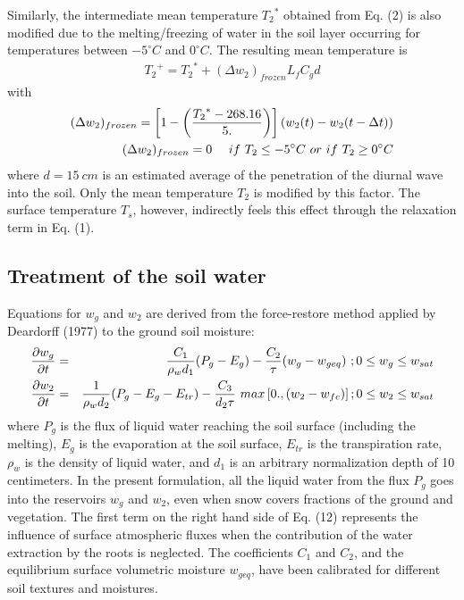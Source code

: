 Similarly, the intermediate mean temperature ${T_2}^*$ obtained
from Eq. (2) is also modified due to the melting/freezing of
water in the soil layer occurring for temperatures
between $-5^\circ C$ and $0^\circ C$.
The resulting mean temperature is
\begin{eqnarray}
{T_2}^+ = {T_2}^* + (\Delta w_2)_{frozen} L_f C_g d
\end{eqnarray}
with
\begin{eqnarray}
(\Delta w_2)_{frozen} = \left[ 1 - \left( { {T_2}^*-268.16
\over 5. } \right) \right] \left( w_2(t) - w_2(t-\Delta t) \right) \\
(\Delta w_2)_{frozen} = 0  \ \ \ \ if \ T_2 \leq -5^\circ C \
or \ if \ T_2 \geq 0^\circ C
\end{eqnarray}
where $d=15 \ cm$ is an estimated average of the penetration of the
diurnal wave into the soil.
Only the mean temperature $T_2$ is modified
by this factor.
The surface temperature $T_s$, however, indirectly
feels this effect through the relaxation term in Eq. (1).

\subsection{Treatment of the soil water}

Equations for $w_g$ and $w_2$ are derived from the force-restore
method applied by Deardorff (1977) to the ground soil moisture:
\begin{eqnarray}
{\partial w_g \over \partial t}&=&{ C_1 \over \rho_w d_1}
(P_g - E_g) - {C_2 \over \tau} ( w_g - w_{geq} ) \ ;
0 \leq w_g \leq w_{sat} \\
{\partial w_2 \over \partial t}&=&{1 \over \rho_w d_2}
(P_g - E_g - E_{tr}) - { C_3 \over d_2 \tau} \ max
\left[ 0., ( w_2 - w_{fc} ) \right] ; 0 \leq w_2 \leq w_{sat}
\end{eqnarray}
where $P_g$ is the flux of liquid water reaching the soil surface
(including the melting),
$E_g$ is the evaporation at the soil surface,
$E_{tr}$ is the transpiration rate,
$\rho_w$ is the density of liquid water,
and $d_1$ is an arbitrary normalization depth of 10 centimeters.
In the present formulation, all the liquid water from
the flux $P_g$ goes into the
reservoirs $w_g$ and $w_2$, even when snow covers fractions of the
ground and vegetation.
The first term on the right hand side of Eq. (12) represents
the influence of surface atmospheric fluxes when the
contribution of the water extraction by the roots is neglected.
The coefficients $C_1$ and $C_2$, and the equilibrium surface volumetric
moisture $w_{geq}$,
have been calibrated for different soil textures and
moistures.

